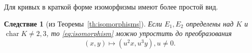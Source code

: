 \documentclass[12pt]{article}
\newcommand{\bigO}{\mathcal{O}}
\newtheorem{corollary}[theorem]{Следствие}
\theoremstyle{definition}
\theoremstyle{definition}
\newtheorem{examples}[theorem]{Примеры}
\theoremstyle{definition}
\begin{document}
%


Для кривых в краткой форме изоморфизмы имеют более простой вид.

\begin{corollary}[из Теоремы~\ref{th:isomorphisms}]
	Если $E_1, E_2$ определены над $K$ и $\operatorname{char}{K} \neq 2,3$, то \eqref{eq:isomorphism} можно упростить до преобразования
	\[
	(x,y) \mapsto (u^2x, u^3y), u \neq 0.
	\]
\end{corollary}
%            

\nocite{Menezes1993,Blake1999,HankersonMenezesVanstone2006,Washington2008}
\printbibliography
\end{document}
